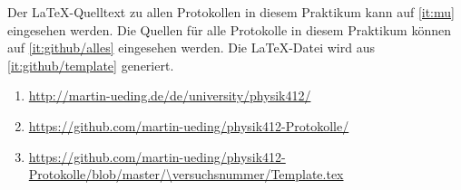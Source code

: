\begin{appendix}
    Der \LaTeX-Quelltext zu allen Protokollen in diesem Praktikum kann auf
    \ref{it:mu} eingesehen werden. Die Quellen für alle Protokolle in diesem
    Praktikum können auf \ref{it:github/alles} eingesehen werden. Die
    \LaTeX-Datei wird aus \ref{it:github/template} generiert.

    \begin{enumerate}
        \item
            \label{it:mu}
            \url{http://martin-ueding.de/de/university/physik412/}
        \item
            \label{it:github/alles}
            \url{https://github.com/martin-ueding/physik412-Protokolle/}
        \item
            \label{it:github/template}
            \url{https://github.com/martin-ueding/physik412-Protokolle/blob/master/\versuchsnummer/Template.tex}
    \end{enumerate}
\end{appendix}



\FloatBarrier
\IfFileExists{\bibliographyfile}{
    
}{}



